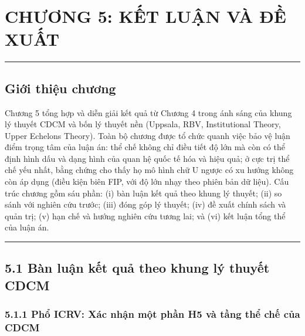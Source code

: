 \documentclass[
  a4paper,
  13pt]{extreport}
\author{}
\date{}
\begin{document}
\hypertarget{chux1b0ux1a1ng-5-kux1ebft-luux1eadn-vuxe0-ux111ux1ec1-xuux1ea5t}{%
\chapter{CHƯƠNG 5: KẾT LUẬN VÀ ĐỀ
XUẤT}\label{chux1b0ux1a1ng-5-kux1ebft-luux1eadn-vuxe0-ux111ux1ec1-xuux1ea5t}}

\begin{center}\rule{0.5\linewidth}{0.5pt}\end{center}

\hypertarget{giux1edbi-thiux1ec7u-chux1b0ux1a1ng}{%
\section{Giới thiệu chương}\label{giux1edbi-thiux1ec7u-chux1b0ux1a1ng}}

Chương 5 tổng hợp và diễn giải kết quả từ Chương 4 trong ánh sáng của
khung lý thuyết CDCM và bốn lý thuyết nền (Uppsala, RBV, Institutional
Theory, Upper Echelons Theory). Toàn bộ chương được tổ chức quanh việc
bảo vệ luận điểm trọng tâm của luận án: thể chế không chỉ điều tiết độ
lớn mà còn có thể định hình dấu và dạng hình của quan hệ quốc tế hóa và
hiệu quả; ở cực trị thể chế yếu nhất, bằng chứng cho thấy họ mô hình chữ
U ngược có xu hướng không còn áp dụng (điều kiện biên FIP, với độ lớn
nhạy theo phiên bản dữ liệu). Cấu trúc chương gồm sáu phần: (i) bàn luận
kết quả theo khung lý thuyết; (ii) so sánh với nghiên cứu trước; (iii)
đóng góp lý thuyết; (iv) đề xuất chính sách và quản trị; (v) hạn chế và
hướng nghiên cứu tương lai; và (vi) kết luận tổng thể của luận án.

\begin{center}\rule{0.5\linewidth}{0.5pt}\end{center}

\hypertarget{buxe0n-luux1eadn-kux1ebft-quux1ea3-theo-khung-luxfd-thuyux1ebft-cdcm}{%
\section{5.1 Bàn luận kết quả theo khung lý thuyết
CDCM}\label{buxe0n-luux1eadn-kux1ebft-quux1ea3-theo-khung-luxfd-thuyux1ebft-cdcm}}

\hypertarget{phux1ed5-icrv-xuxe1c-nhux1eadn-mux1ed9t-phux1ea7n-h5-vuxe0-tux1ea7ng-thux1ec3-chux1ebf-cux1ee7a-cdcm}{%
\subsection{5.1.1 Phổ ICRV: Xác nhận một phần H5 và tầng thể chế của
CDCM}\label{phux1ed5-icrv-xuxe1c-nhux1eadn-mux1ed9t-phux1ea7n-h5-vuxe0-tux1ea7ng-thux1ec3-chux1ebf-cux1ee7a-cdcm}}
\end{document}
